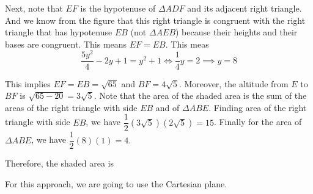 \documentclass[11pt,paper=letter]{scrartcl}
\begin{document}
\begin{center}
\end{center}

Next, note that $EF$ is the hypotenuse of $\Delta ADF$ and its adjacent right triangle. And we know from the figure that this right triangle is congruent with the right triangle that has hypotenuse $EB$ (not $\Delta AEB$) because their heights and their bases are congruent. This means $EF = EB.$ This meas $$\dfrac{5y^2}{4} -2y + 1 = y^2 + 1 \Leftrightarrow \dfrac{1}{4}y = 2 \implies y=8$$

This implies $EF=EB=\sqrt{65}$ and $BF = 4\sqrt{5}$. Moreover, the altitude from $E$ to $BF$ is $\sqrt{65-20} = 3\sqrt{5}$. Note that the area of the shaded area is the sum of the areas of the right triangle with side $EB$ and of $\Delta ABE$. Finding area of the right triangle with side $EB$, we have $\dfrac{1}{2}(3\sqrt{5})(2\sqrt{5}) = 15$. Finally for the area of $\Delta ABE$, we have $\dfrac{1}{2}(8)(1) = 4.$

Therefore, the shaded area is 


For this approach, we are going to use the Cartesian plane. 
\end{document}
